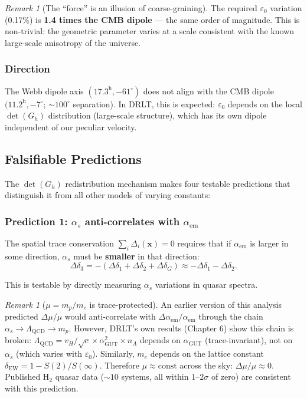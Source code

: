 \documentclass[12pt]{article}
\theoremstyle{remark}
\newtheorem{remark}[theorem]{Remark}
\theoremstyle{definition}
\newcommand{\agut}{\alpha_{\mathrm{GUT}}}
\begin{document}
\begin{remark}[The ``force'' is an illusion of coarse-graining]
The required $\varepsilon_0$ variation (0.17\%) is \textbf{1.4 times the CMB dipole} --- the same order of magnitude. This is non-trivial: the geometric parameter varies at a scale consistent with the known large-scale anisotropy of the universe.

\subsubsection{Direction}

The Webb dipole axis $(17.3^\text{h}, -61^\circ)$ does not align with the CMB dipole $(11.2^\text{h}, -7^\circ$; $\sim 100^\circ$ separation). In DRLT, this is expected: $\varepsilon_0$ depends on the local $\det(G_h)$ distribution (large-scale structure), which has its own dipole independent of our peculiar velocity.

\subsection{Falsifiable Predictions}

The $\det(G_h)$ redistribution mechanism makes four testable predictions that distinguish it from all other models of varying constants:

\subsubsection{Prediction 1: $\alpha_s$ anti-correlates with $\alpha_\text{em}$}

The spatial trace conservation $\sum_i \Delta_i(\mathbf{x}) = 0$ requires that if $\alpha_\text{em}$ is larger in some direction, $\alpha_s$ must be \textbf{smaller} in that direction:
\begin{equation}
\Delta\delta_3 = -(\Delta\delta_1 + \Delta\delta_2 + \Delta\delta_G) \approx -\Delta\delta_1 - \Delta\delta_2.
\end{equation}

This is testable by directly measuring $\alpha_s$ variations in quasar spectra.

\begin{remark}[$\mu = m_p/m_e$ is trace-protected]
An earlier version of this analysis predicted $\Delta\mu/\mu$ would anti-correlate with $\Delta\alpha_\text{em}/\alpha_\text{em}$ through the chain $\alpha_s \to \Lambda_\text{QCD} \to m_p$. However, DRLT's own results (Chapter 6) show this chain is broken: $\Lambda_\text{QCD} = v_H/\sqrt{c} \times \agut^2 \times n_A$ depends on $\agut$ (trace-invariant), not on $\alpha_s$ (which varies with $\varepsilon_0$). Similarly, $m_e$ depends on the lattice constant $\delta_\text{EW} = 1 - S(2)/S(\infty)$. Therefore $\mu \approx \text{const}$ across the sky: $\Delta\mu/\mu \approx 0$. Published H$_2$ quasar data ($\sim 10$ systems, all within $1$--$2\sigma$ of zero) are consistent with this prediction.
\end{remark}


\end{remark}
\end{document}
